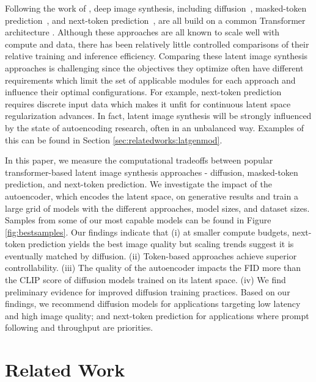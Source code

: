 \label{sec:introduction}

Following the work of \cite{peebles2023scalable}, deep image synthesis, including diffusion~\citep{sohl2015deep,song2019generative,song2020score,ho2020denoising,rombach2022highresolution,esser2024scaling}, masked-token prediction~\citep{chang2022maskgit, chang2023muse, villegas2022phenaki, yu2024language}, and next-token prediction~\citep{gafni2022makeascene, yu2022scaling, esser2021taming}, are all build on a common Transformer architecture \citep{vaswani2023attention}. 
Although these approaches are all known to scale well with compute and data, there has been relatively little controlled comparisons of their relative training and inference efficiency. Comparing these latent image synthesis approaches is challenging since the objectives they optimize often have different requirements which limit the set of applicable modules for each approach and influence their optimal configurations. For example, next-token prediction requires discrete input data which makes it unfit for continuous latent space regularization advances. In fact, latent image synthesis will be strongly influenced by the state of autoencoding research, often in an unbalanced way. Examples of this can be found in Section \ref{sec:relatedworks:latgenmod}.

In this paper, we measure the computational tradeoffs between popular transformer-based latent image synthesis approaches - diffusion, masked-token prediction, and next-token prediction. We investigate the impact of the autoencoder, which encodes the latent space, on generative results and train a large grid of models with the different approaches, model sizes, and dataset sizes.  Samples from some of our most capable models can be found in Figure \ref{fig:bestsamples}. Our findings indicate that (i) at smaller compute budgets, next-token prediction yields the best image quality but scaling trends suggest it is eventually matched by diffusion. (ii) Token-based approaches achieve superior controllability. (iii) The quality of the autoencoder impacts the FID more than the CLIP score of diffusion models trained on its latent space. (iv) We find preliminary evidence for improved diffusion training practices. Based on our findings, we recommend diffusion models for applications targeting low latency and high image quality; and next-token prediction for applications where prompt following and throughput are priorities.

\bestsamples\section{Related Work}
\label{sec:relatedworks}

